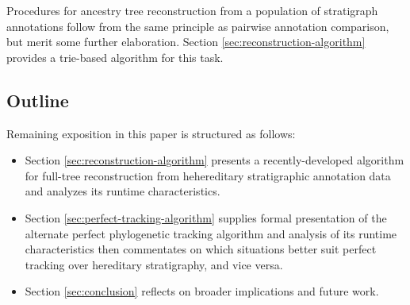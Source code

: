 Procedures for ancestry tree reconstruction from a population of stratigraph annotations follow from the same principle as pairwise annotation comparison, but merit some further elaboration.
Section \ref{sec:reconstruction-algorithm} provides a trie-based algorithm for this task.

\subsection{Outline}

Remaining exposition in this paper is structured as follows:
\begin{itemize}
\item Section \ref{sec:reconstruction-algorithm} presents a recently-developed algorithm for full-tree reconstruction from hehereditary stratigraphic annotation data and analyzes its runtime characteristics.
\item Section \ref{sec:perfect-tracking-algorithm} supplies formal presentation of the alternate perfect phylogenetic tracking algorithm and analysis of its runtime characteristics then commentates on which situations better suit perfect tracking over hereditary stratigraphy, and vice versa.
\item Section \ref{sec:conclusion} reflects on broader implications and future work.
\end{itemize}

